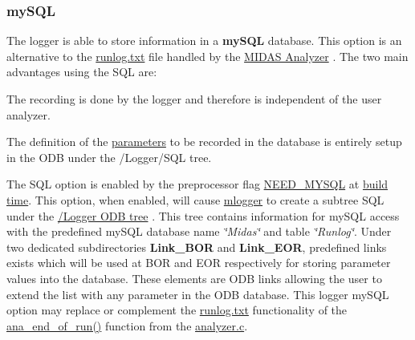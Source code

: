 \par
 \label{F_mySQL_idx_mySQL_database}
\hypertarget{F_mySQL_idx_mySQL_database}{}
 \hypertarget{F_mySQL_F_Logger_mySQL}{}\subsubsection{mySQL}\label{F_mySQL_F_Logger_mySQL}
The logger is able to store information in a {\bfseries mySQL} database. This option is an alternative to the \hyperlink{DataAnalysis_DA_run_log_file}{runlog.txt} file handled by the \hyperlink{DataAnalysis_DA_Midas_Analyzer}{MIDAS Analyzer} . The two main advantages using the SQL are:
\begin{DoxyItemize}
\item The recording is done by the logger and therefore is independent of the user analyzer.
\item The definition of the \hyperlink{structparameters}{parameters} to be recorded in the database is entirely setup in the ODB under the /Logger/SQL tree.
\end{DoxyItemize}

The SQL option is enabled by the preprocessor flag \hyperlink{BuildingOptions_BO_NEED_MYSQL}{NEED\_\-MYSQL} at \hyperlink{BuildingOptions_BO_building_option}{build time}. This option, when enabled, will cause \hyperlink{F_Logging_F_mlogger_utility}{mlogger} to create a subtree SQL under the \hyperlink{F_Logging_Data_F_Logger_tree}{/Logger ODB tree} . This tree contains information for mySQL access with the predefined mySQL database name {\itshape \char`\"{}Midas\char`\"{}\/} and table {\itshape \char`\"{}Runlog\char`\"{}\/}. Under two dedicated subdirectories {\bfseries Link\_\-BOR} and {\bfseries Link\_\-EOR}, predefined links exists which will be used at BOR and EOR respectively for storing parameter values into the database. These elements are ODB links allowing the user to extend the list with any parameter in the ODB database. This logger mySQL option may replace or complement the \hyperlink{DataAnalysis_DA_run_log_file}{runlog.txt} functionality of the \hyperlink{analyzer_8c_a8e03cbe2637bd6f4488a659c9f23d29e}{ana\_\-end\_\-of\_\-run()} function from the \hyperlink{analyzer_8c}{analyzer.c}.

